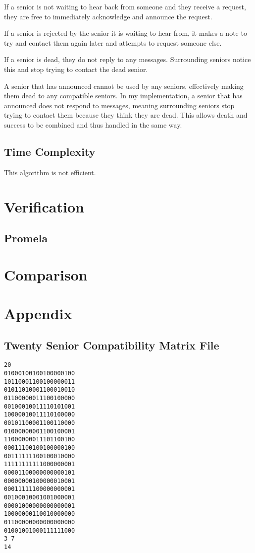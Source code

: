 \documentclass[a4paper]{article}
\begin{document}
If a senior is not waiting to hear back from someone and they receive a request, they are free to immediately acknowledge and announce the request. 

If a senior is rejected by the senior it is waiting to hear from, it makes a note to try and contact them again later and attempts to request someone else. 

If a senior is dead, they do not reply to any messages. Surrounding seniors notice this and stop trying to contact the dead senior. 

A senior that has announced cannot be used by any seniors, effectively making them dead to any compatible seniors. In my implementation, a senior that has announced does not respond to messages, meaning surrounding seniors stop trying to contact them because they think they are dead. This allows death and success to be combined and thus handled in the same way. 

\subsection{Time Complexity}
This algorithm is not efficient.



\section{Verification}
\subsection{Promela}

\section{Comparison}


\section{Appendix}
\subsection{Twenty Senior Compatibility Matrix File}
\begin{verbatim}
20
01000100100100000100
10110001100100000011
01011010001100010010
01100000011100100000
00100010011110101001
10000010011110100000
00101100001100110000
01000000001100100001
11000000011101100100
00011100100100000100
00111111100100010000
11111111111000000001
00001100000000000101
00000000100000010001
00011111100000000001
00100010001001000001
00001000000000000001
10000000110010000000
01100000000000000000
01001001000111111000
3 7
14
\end{verbatim}
\end{document}
